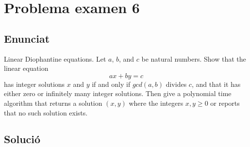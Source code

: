 \section{Problema examen 6}
\subsection{Enunciat}
Linear Diophantine equations. Let $a$, $b$, and $c$ be natural numbers. Show that the linear equation
\[
ax + by = c
\]
has integer solutions $x$ and $y$ if and only if $gcd(a,b)$ divides $c$, and that it has either zero or infinitely many integer solutions. Then give a polynomial time algorithm that returns a solution $(x,y)$ where the integers $x,y \geq 0$ or reports that no such solution exists.

\subsection{Solució}